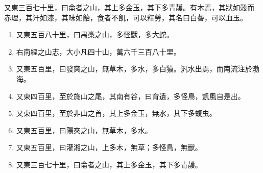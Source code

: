 \documentclass[10pt]{article} %
\begin{document}
\begin{minipage}[t]{.66\linewidth} %

\hypertarget{thirdnews}{} %

\begin{multicols}{2} %

\zhlipsum[6,7,8][name=xiangyu]

\BackToContents %

\end{multicols}


\begin{mdframed}[style=intextbox,frametitle={}] %

\hypertarget{descriptivebox}{} %

又東三百七十里，曰侖者之山，其上多金玉，其下多青䨼。有木焉，其狀如穀而
赤理，其汗如漆，其味如飴，食者不飢，可以釋勞，其名曰白䓘，可以血玉。
\begin{enumerate}
\item 又東五百八十里，曰禺槀之山，多怪獸，多大蛇。
\item 右南經之山志，大小凡四十山，萬六千三百八十里。
\item 又東五百里，曰發爽之山，無草木，多水，多白猿。汎水出焉，而南流注於渤海。
\item 又東四百里，至於旄山之尾，其南有谷，曰育遺，多怪鳥，凱風自是出。
\item 又東四百里，至於非山之首，其上多金玉，無水，其下多蝮虫。
\item 又東五百里，曰陽夾之山，無草木，多水。
\item 又東五百里，曰灌湘之山，上多木，無草；多怪鳥，無獸。
\item 又東三百七十里，曰侖者之山，其上多金玉，其下多青䨼。
\end{enumerate}

\BackToContents %

\end{mdframed}



\end{minipage}
\end{document}
